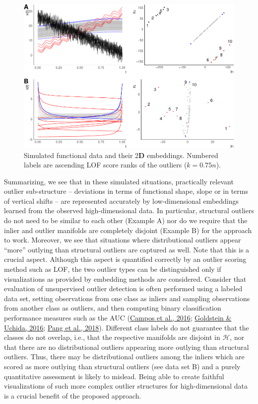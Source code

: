 \documentclass[
  10pt]{article}
\newcommand{\hdspace}{\mathcal{H}}
\newcommand{\vizdim}{\mathbf{D}}        %
\begin{document}
\begin{figure}
\centering
\includegraphics{00_paper_wires_files/figure-latex/fda-simulated-1.pdf}
\caption{\label{fig:fda-simulated}\label{fig:exps-sim} Simulated functional data and their 2\(\vizdim\) embeddings. Numbered labels are ascending LOF score ranks of the outliers (\(k = 0.75n\)).}
\end{figure}

Summarizing, we see that in these simulated situations, practically relevant outlier sub-structure -- deviations in terms of functional shape, slope or in terms of vertical shifts -- are represented accurately by low-dimensional embeddings learned from the observed high-dimensional data. In particular, structural outliers do not need to be similar to each other (Example A) nor do we require that the inlier and outlier manifolds are completely disjoint (Example B) for the approach to work.
Moreover, we see that situations where distributional outliers appear ``more'' outlying than structural outliers are captured as well. Note that this is a crucial aspect. Although this aspect is quantified correctly by an outlier scoring method such as LOF, the two outlier types can be distinguished only if visualizations as provided by embedding methods are considered. Consider that evaluation of unsupervised outlier detection is often performed using a labeled data set, setting observations from one class as inliers and sampling observations from another class as outliers, and then computing binary classification performance measures such as the AUC (\protect\hyperlink{ref-campos2016evaluation}{Campos et al., 2016}; \protect\hyperlink{ref-goldstein2016comparative}{Goldstein \& Uchida, 2016}; \protect\hyperlink{ref-pang2018learning}{Pang et al., 2018}). Different class labels do not guarantee that the classes do not overlap, i.e., that the respective manifolds are disjoint in \(\hdspace\), nor that there are no distributional outliers appearing more outlying than structural outliers. Thus, there may be distributional outliers among the inliers which are scored as more outlying than structural outliers (see data set B) and a purely quantitative assessment is likely to mislead. Being able to create faithful visualizations of such more complex outlier structures for high-dimensional data is a crucial benefit of the proposed approach.
\end{document}
